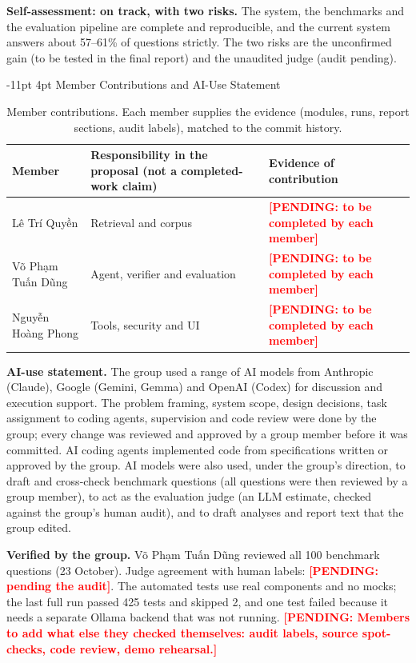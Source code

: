 \documentclass[a4paper,11pt]{article}
\makeatletter
\renewcommand\section{\@startsection{section}{1}{\z@}%
                                   {-11pt \@plus -2pt \@minus -1pt}%
                                   {4pt \@plus 1pt \@minus 1pt}%
                                   {\normalfont\large\bfseries}}
\newcommand{\hdr}[1]{\par\vspace{1.5pt}\noindent\textbf{#1}}
\newcommand{\pending}[1]{\textcolor{red}{\textbf{[PENDING: #1]}}}
\newcommand{\tabstyle}{\centering\small\renewcommand{\arraystretch}{1.1}\setlength{\tabcolsep}{4pt}}
\makeatother
\begin{document}
\hdr{Self-assessment: on track, with two risks.} The system, the benchmarks and the evaluation pipeline are complete and reproducible, and the current system answers about 57--61\% of questions strictly. The two risks are the unconfirmed gain (to be tested in the final report) and the unaudited judge (audit pending).

\section{Member Contributions and AI-Use Statement}\label{sec:contrib}
\begin{table}[!htbp]\tabstyle
\begin{tabularx}{\textwidth}{@{}L{3.6cm}L{4.4cm}Y@{}}
\toprule Member & Responsibility in the proposal (not a completed-work claim) & Evidence of contribution\\\midrule
Lê Trí Quyền & Retrieval and corpus & \pending{to be completed by each member}\\
Võ Phạm Tuấn Dũng & Agent, verifier and evaluation & \pending{to be completed by each member}\\
Nguyễn Hoàng Phong & Tools, security and UI & \pending{to be completed by each member}\\
\bottomrule\end{tabularx}
\caption{Member contributions. Each member supplies the evidence (modules, runs, report sections, audit labels), matched to the commit history.}\label{tab:contrib}
\end{table}

\hdr{AI-use statement.} The group used a range of AI models from Anthropic (Claude), Google (Gemini, Gemma) and OpenAI (Codex) for discussion and execution support. The problem framing, system scope, design decisions, task assignment to coding agents, supervision and code review were done by the group; every change was reviewed and approved by a group member before it was committed. AI coding agents implemented code from specifications written or approved by the group. AI models were also used, under the group's direction, to draft and cross-check benchmark questions (all questions were then reviewed by a group member), to act as the evaluation judge (an LLM estimate, checked against the group's human audit), and to draft analyses and report text that the group edited.

\hdr{Verified by the group.} Võ Phạm Tuấn Dũng reviewed all 100 benchmark questions (23 October). Judge agreement with human labels: \pending{pending the audit}. The automated tests use real components and no mocks; the last full run passed 425 tests and skipped 2, and one test failed because it needs a separate Ollama backend that was not running. \pending{Members to add what else they checked themselves: audit labels, source spot-checks, code review, demo rehearsal.}
\end{document}

